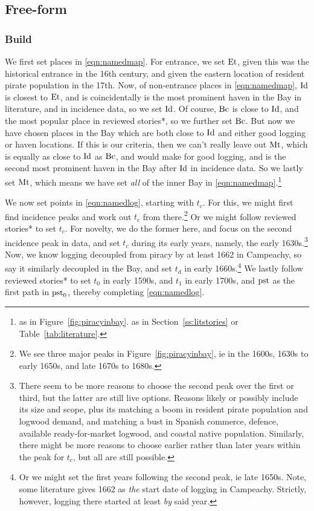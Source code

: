 	\subsection{Free-form}
	\label{ss:freestories}
		\subsubsection{Build}
		\label{sss:storybuild}
		We first set places in \ref{eqn:namedmap}. For entrance, we set \(\operatorname{Et}\), given this was the historical entrance in the 16th century, and given the eastern location of resident pirate population in the 17th. Now, of non-entrance places in \ref{eqn:namedmap}, \(\operatorname{Id}\) is closest to \(\operatorname{Et}\), and is coincidentally is the most prominent haven in the Bay in literature, and in incidence data, so we set \(\operatorname{Id}\). Of course, \(\operatorname{Bc}\) is close to \(\operatorname{Id}\), and the most popular place in reviewed stories*, so we further set \(\operatorname{Bc}\). But now we have chosen places in the Bay which are both close to \(\operatorname{Id}\) and either good logging or haven locations. If this is our criteria, then we can't really leave out \(\operatorname{Mt}\), which is equally as close to \(\operatorname{Id}\) as \(\operatorname{Bc}\), and would make for good logging, and is the second most prominent haven in the Bay after \(\operatorname{Id}\) in incidence data. So we lastly set \(\operatorname{Mt}\), which means we have set \emph{all} of the inner Bay in \ref{eqn:namedmap}.\footnote{ as in Figure~\ref{fig:piracyinbay}.  as in Section~\ref{ss:litstories} or Table~\ref{tab:literature}.}
		
		We now set points in \ref{eqn:namedlog}, starting with \(t_c\). For this, we might first find incidence peaks and work out \(t_c\) from there.\footnote{We see three major peaks in Figure~\ref{fig:piracyinbay}, ie in the 1600s, 1630s to early 1650s, and late 1670s to 1680s.} Or we might follow reviewed stories* to set \(t_c\). For novelty, we do the former here, and focus on the second incidence peak in data, and set \(t_c\) during its early years, namely, the early 1630s.\footnote{There seem to be more reasons to choose the second peak over the first or third, but the latter are still live options. Reasons likely or possibly include its size and scope, plus its matching a boom in resident pirate population and logwood demand, and matching a bust in Spanish commerce, defence, available ready-for-market logwood, and coastal native population. Similarly, there might be more reasons to choose earlier rather than later years within the peak for \(t_c\), but all are still possible.} Now, we know logging decoupled from piracy by at least 1662 in Campeachy, so say it similarly decoupled in the Bay, and set \(t_d\) in early 1660s.\footnote{Or we might set the first years following the second peak, ie late 1650s. Note, some literature gives 1662 as \emph{the} start date of logging in Campeachy. Strictly, however, logging there started at least \emph{by} said year.} We lastly follow reviewed stories* to set \(t_0\) in early 1590s, and \(t_1\) in early 1700s, and \(\operatorname{pst}\) as the first path in \(\operatorname{pst}_0\), thereby completing \ref{eqn:namedlog}.
